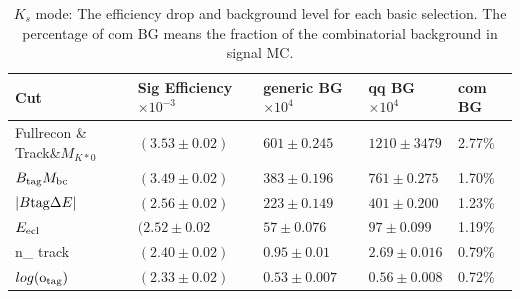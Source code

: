 \begin{table}[ht]
 \small
\begin{center}
\begin{tabular}{ |p{2.2cm}||p{3.6cm}||p{2.8cm}||p{2.1cm}||p{1.3cm}|| }
 \hline
 Cut& Sig Efficiency$\times10^{-3}$  & generic BG$\times10^{4}$&qq BG$\times10^{4}$& com BG \\
\hline
\hline
  Fullrecon \& Track\&$M_{K*0} $	& $(3.53\pm 0.02)$ &$601\pm 0.245$&$1210\pm 3479$	&2.77\% \\ %
 \hline
 $B_{\rm{tag}}M_{\rm{bc}}$  		& $(3.49\pm 0.02)$ &$383 \pm 0.196$&$761 \pm 0.275$	&1.70\%\\ %
 \hline
 $ | B{\rm{tag}}\Delta E |$  		& $(2.56\pm 0.02)$	&$223 \pm 0.149$&$401 \pm0.200$	&1.23\%\\ %
 \hline
 $E_{\rm{ecl}}$				& $(2.52 \pm 0.02$	&$57\pm0.076$&$97\pm0.099$	&1.19\%\\ %
 \hline
 n\_ track					& $(2.40 \pm 0.02)$	&$0.95\pm0.01$&$2.69\pm0.016$	&0.79\%\\ %
 \hline		
$log(\rm{o_{tag}})$ 				& $(2.33\pm0.02)$	&$0.53\pm0.007$&$0.56\pm0.008$	&0.72\% \\ %
 \hline
\end{tabular}
\caption{$K_s$ mode: The efficiency drop and background level for each basic selection. The percentage of com BG means the fraction of the combinatorial background in signal MC. } \label{t:efficiency_ks}\end{center}
\end{table}
